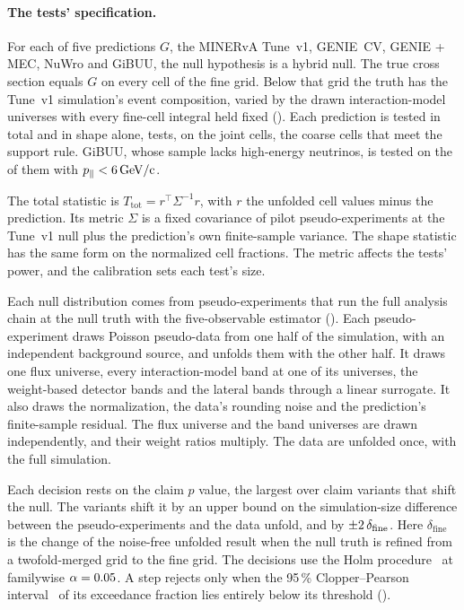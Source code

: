 \paragraph{The tests' specification.} For each of five predictions $G$, the MINERvA Tune~v1, GENIE~CV, GENIE + MEC, NuWro and GiBUU, the null hypothesis is a hybrid null. The true cross section equals $G$ on every cell of the fine grid. Below that grid the truth has the Tune~v1 simulation's event composition, varied by the drawn interaction-model universes with every fine-cell integral held fixed (). Each prediction is tested in total and in shape alone, \jtNtests{} tests, on the \jtNcells{} joint cells, the coarse cells that meet the support rule. GiBUU, whose sample lacks high-energy neutrinos, is tested on the \jtNcellsGiBUU{} of them with $p_{\parallel}<\SI{6}{GeV/c}$.

The total statistic is $T_{\mathrm{tot}}=r^{\top}\Sigma^{-1}r$, with $r$ the unfolded cell values minus the prediction. Its metric $\Sigma$ is a fixed covariance of pilot pseudo-experiments at the Tune~v1 null plus the prediction's own finite-sample variance. The shape statistic has the same form on the normalized cell fractions. The metric affects the tests' power, and the calibration sets each test's size.

Each null distribution comes from pseudo-experiments that run the full analysis chain at the null truth with the five-observable estimator (). Each pseudo-experiment draws Poisson pseudo-data from one half of the simulation, with an independent background source, and unfolds them with the other half. It draws one flux universe, every interaction-model band at one of its universes, the weight-based detector bands and the lateral bands through a linear surrogate. It also draws the normalization, the data's rounding noise and the prediction's finite-sample residual. The flux universe and the band universes are drawn independently, and their weight ratios multiply. The data are unfolded once, with the full simulation.

Each decision rests on the claim $p$ value, the largest over claim variants that shift the null. The variants shift it by an upper bound on the simulation-size difference between the pseudo-experiments and the data unfold, and by $\pm2\,\delta_{\mathrm{fine}}$. Here $\delta_{\mathrm{fine}}$ is the change of the noise-free unfolded result when the null truth is refined from a twofold-merged grid to the fine grid. The decisions use the Holm procedure~\cite{Holm:1979} at familywise $\alpha=0.05$. A step rejects only when the 95\,\% Clopper--Pearson interval~\cite{Clopper:1934} of its exceedance fraction lies entirely below its threshold ().

